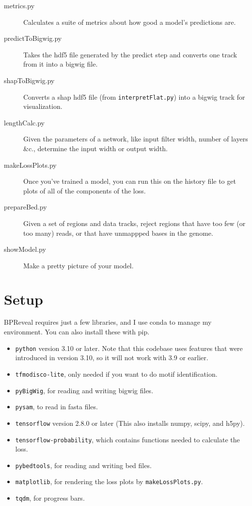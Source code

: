 \documentclass{article}
\begin{document}
\begin{description}
    \item [metrics.py] Calculates a suite of metrics about how good a model's predictions are.
    \item [predictToBigwig.py] Takes the hdf5 file generated by the predict step and converts one track from it into a bigwig file.
    \item [shapToBigwig.py] Converts a shap hdf5 file (from \texttt{interpretFlat.py}) into a bigwig track for visualization.
    \item [lengthCalc.py] Given the parameters of a network, like input filter width, number of layers \&c., determine the input width or output width.
    \item [makeLossPlots.py] Once you've trained a model, you can run this on the history file to get plots of all of the components of the loss.
    \item [prepareBed.py] Given a set of regions and data tracks, reject regions that have too few (or too many) reads, or that have unmappped bases in the genome.
    \item [showModel.py] Make a pretty picture of your model.
\end{description}

\newpage

\section{Setup}

BPReveal requires just a few libraries, and I use conda to manage my environment. You can also install these with pip.

\begin{itemize}
    \item \texttt{python} version 3.10 or later. Note that this codebase uses features that were introduced in version 3.10, so it will not work with 3.9 or earlier.
    \item \texttt{tfmodisco-lite}, only needed if you want to do motif identification.
    \item \texttt{pyBigWig}, for reading and writing bigwig files.
    \item \texttt{pysam}, to read in fasta files.
    \item \texttt{tensorflow} version 2.8.0 or later (This also installs numpy, scipy, and h5py).
    \item \texttt{tensorflow-probability}, which contains functions needed to calculate the loss.
    \item \texttt{pybedtools}, for reading and writing bed files.
    \item \texttt{matplotlib}, for rendering the loss plots by \texttt{makeLossPlots.py}.
    \item \texttt{tqdm}, for progress bars.
\end{itemize}
\end{document}
